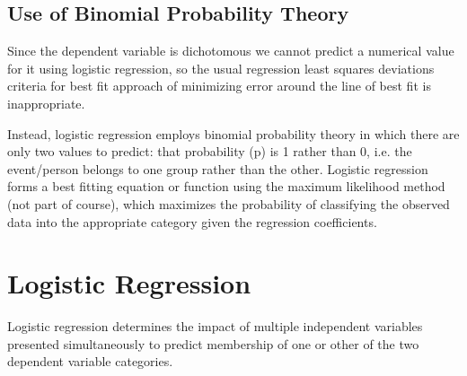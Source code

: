 ﻿\documentclass[a4paper,12pt]{article}
\begin{document}
\subsection{Use of Binomial Probability Theory}
Since the dependent variable is dichotomous we cannot predict a numerical value for it
using logistic regression, so the usual regression least squares deviations criteria for best fit
approach of minimizing error around the line of best fit is inappropriate.

Instead, logistic regression employs binomial probability theory in which there are only two values to
predict: that probability (p) is 1 rather than 0, i.e. the event/person belongs to one group
rather than the other. Logistic regression forms a best fitting equation or function using the
maximum likelihood method (not part of course), which maximizes the probability of classifying the observed
data into the appropriate category given the regression coefficients.

\newpage
\section{Logistic Regression}
Logistic regression determines the impact of multiple independent variables
presented simultaneously to predict membership of one or other of the two
dependent variable categories.
\end{document}
